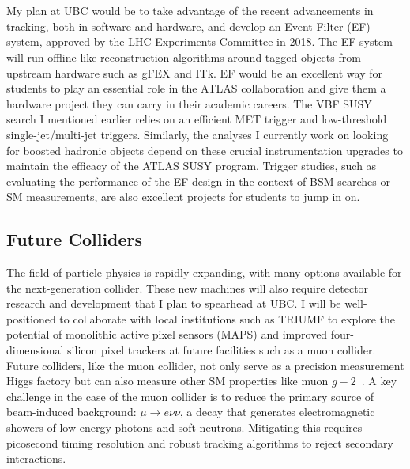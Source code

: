 \documentclass[10pt,a4paper,sans]{moderncv} %
\begin{document}
\\
\\
My plan at UBC would be to take advantage of the recent advancements in tracking, both in software and hardware, and develop an Event Filter (EF) system, approved by the LHC Experiments Committee in 2018. The EF system will run offline-like reconstruction algorithms around tagged objects from upstream hardware such as gFEX and ITk. EF would be an excellent way for students to play an essential role in the ATLAS collaboration and give them a hardware project they can carry in their academic careers. The VBF SUSY search I mentioned earlier relies on an efficient MET trigger and low-threshold single-jet/multi-jet triggers. Similarly, the analyses I currently work on looking for boosted hadronic objects depend on these crucial instrumentation upgrades to maintain the efficacy of the ATLAS SUSY program. Trigger studies, such as evaluating the performance of the EF design in the context of BSM searches or SM measurements, are also excellent projects for students to jump in on.

\subsection{Future Colliders}
The field of particle physics is rapidly expanding, with many options available for the next-generation collider. These new machines will also require detector research and development that I plan to spearhead at UBC. I will be well-positioned to collaborate with local institutions such as TRIUMF to explore the potential of monolithic active pixel sensors (MAPS) and improved four-dimensional silicon pixel trackers at future facilities such as a muon collider. Future colliders, like the muon collider, not only serve as a precision measurement Higgs factory but can also measure other SM properties like muon $g-2$~\cite{Chakraborti:2021dli}. A key challenge in the case of the muon collider is to reduce the primary source of beam-induced background: $\mu \to e \nu \bar{\nu}$, a decay that generates electromagnetic showers of low-energy photons and soft neutrons. Mitigating this requires picosecond timing resolution and robust tracking algorithms to reject secondary interactions.
\end{document}
